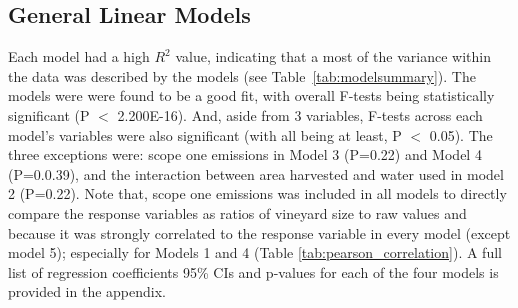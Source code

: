 \documentclass[review,12pt,authoryear]{elsarticle}
\begin{document}
\begin{linenumbers}
\subsection{General Linear Models}

Each model had a high $R^2$ value, indicating that a most of the variance within the data was described by the models (see Table~\ref{tab:modelsummary}). The models were were found to be a good fit, with overall F-tests being statistically significant (P $<$ 2.200E-16). And, aside from 3 variables, F-tests across each model's variables were also significant (with all being at least, P $<$ 0.05). The three exceptions were: scope one emissions in Model 3 (P=0.22) and Model 4 (P=0.0.39), and the interaction between area harvested and water used in model 2 (P=0.22). Note that, scope one emissions was included in all models to directly compare the response variables as ratios of vineyard size to raw values and because it was strongly correlated to the response variable in every model (except model 5); especially for Models 1 and 4 (Table \ref{tab:pearson_correlation}). A full list of regression coefficients 95\% CIs and p-values for each of the four models is provided in the appendix. %
\par
\begin{table}[]
  \caption{Summary of models; their performance, F-statistics and Residual error.}\label{tab:modelsummary}
\end{table}
\end{linenumbers}
\end{document}
